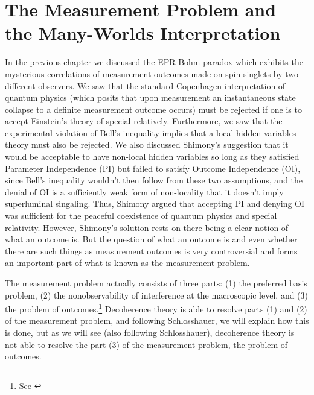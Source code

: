 \chapter{The Measurement Problem and the Many-Worlds Interpretation\label{measprobchap}}
In the previous chapter we discussed the EPR-Bohm paradox which exhibits the mysterious correlations of measurement outcomes made on spin singlets by two different observers. We saw that the standard Copenhagen interpretation of quantum physics (which posits that upon measurement  an instantaneous state collapse to a definite measurement outcome occurs) must be rejected if one is to accept Einstein's theory of special relatively. Furthermore, we saw that the experimental violation of Bell's inequality implies that a local hidden variables theory must also be rejected. We also discussed Shimony's  suggestion that it would be acceptable to have non-local hidden variables so long as they satisfied Parameter Independence (PI) but failed to satisfy Outcome Independence (OI), since Bell's inequality wouldn't then follow from these two assumptions, and the denial of OI is a sufficiently weak form of non-locality that it doesn't imply superluminal singaling. Thus, Shimony argued that accepting PI and denying OI was sufficient for the peaceful coexistence of quantum physics and special relativity. However, Shimony's solution rests on there being a clear notion of what an outcome is. But the question of what an outcome is and even whether there are such things as measurement outcomes is very controversial and forms an important part of what is known as the measurement problem.  

The measurement problem actually consists of three parts: (1) the preferred basis problem, (2) the nonobservability of interference at the macroscopic level, and (3) the problem of outcomes.\footnote{See \cite[50]{Schlosshauer}} 
Decoherence theory is able to resolve parts (1) and (2) of the measurement problem, and following Schlosshauer, we will explain how this is done, but as we will see (also following Schlosshauer), decoherence theory is not able to resolve the part (3) of the measurement problem, the problem of outcomes.

